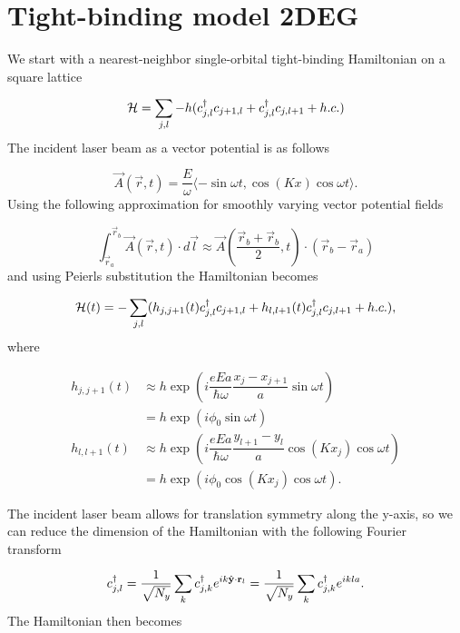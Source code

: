 \section{Tight-binding model 2DEG}

We start with a nearest-neighbor single-orbital tight-binding Hamiltonian on a square lattice

\begin{equation}
  \mathcal{H} = \sum_{j,l} -h (c^{\dagger}_{j,l} c_{j+1,l} + c^{\dagger}_{j,l} c_{j,l+1} + h.c.)
\end{equation}
The incident laser beam as a vector potential is as follows

\begin{equation}
  \vec{A}(\vec{r}, t) = \dfrac{E}{\omega} \langle -\sin\omega t, \cos(Kx) \cos\omega t \rangle.
\end{equation}
Using the following approximation for smoothly varying vector potential fields

\begin{equation}
  \int_{\vec{r}_a}^{\vec{r}_b} \vec{A}(\vec{r},t) \cdot d\vec{l} \approx \vec{A} \left( \dfrac{\vec{r}_b+\vec{r}_b}{2}, t \right) \cdot (\vec{r}_b - \vec{r}_a)
\end{equation}
and using Peierls substitution the Hamiltonian becomes

\begin{equation}
  \mathcal{H}(t) = -\sum_{j,l} (h_{j,j+1}(t) c^{\dagger}_{j,l} c_{j+1,l} + h_{l,l+1}(t) c^{\dagger}_{j,l} c_{j,l+1} + h.c.),
\end{equation}
where

\begin{align}
  h_{j,j+1}(t) &\approx h \exp\left(i \dfrac{eEa}{\hbar \omega} \dfrac{x_j-x_{j+1}}{a} \sin \omega t\right) \nonumber \\
  &= h \exp\left(i \phi_0 \sin \omega t\right) \\
  h_{l,l+1}(t) &\approx h \exp\left(i \dfrac{eEa}{\hbar \omega} \dfrac{y_{l+1}-y_l}{a} \cos(Kx_j)\cos \omega t\right) \nonumber \\
  &= h \exp\left(i \phi_0 \cos(Kx_j)\cos \omega t\right).
\end{align}

The incident laser beam allows for translation symmetry along the y-axis, so we can reduce the dimension of the Hamiltonian with the following Fourier transform

\begin{equation}
  \cc_{j,l} = \dfrac{1}{\sqrt{N_y}} \sum_k \cc_{j,k} e^{ik\hat{y}\cdot \vec{r}_{l}} = \dfrac{1}{\sqrt{N_y}} \sum_k \cc_{j,k} e^{ikla}.
\end{equation}
The Hamiltonian then becomes

